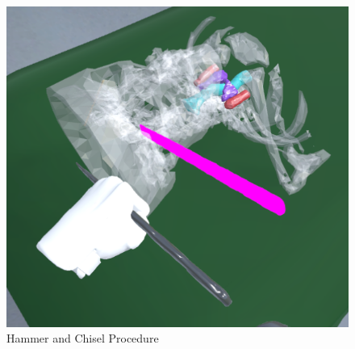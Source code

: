\begin{figure}[ht!]
    \centering
    \includegraphics[width=\linewidth]{images/implementation/features/procedures/chisel.png}
    \caption{\label{fig::FeatureChisel} Hammer and Chisel Procedure}
\end{figure}